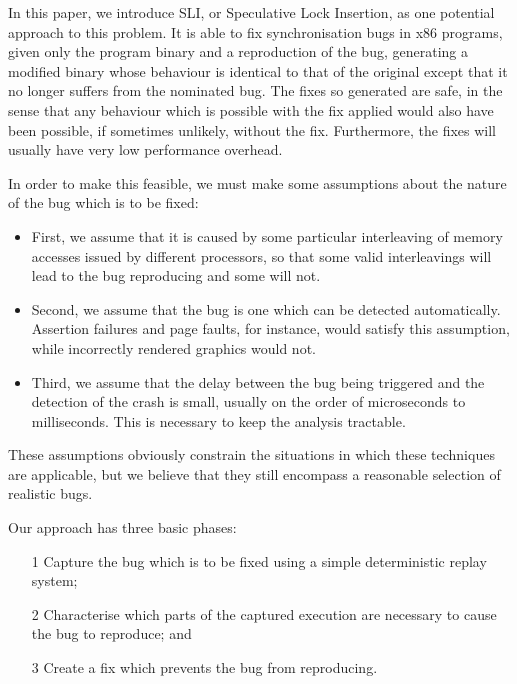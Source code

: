 \documentclass[10pt,a4paper,twocolumn]{article}
\begin{document}
In this paper, we introduce SLI, or Speculative Lock Insertion, as one
potential approach to this problem.  It is able to fix synchronisation
bugs in x86 programs, given only the program binary and a reproduction
of the bug, generating a modified binary whose behaviour is identical
to that of the original except that it no longer suffers from the
nominated bug.  The fixes so generated are safe, in the sense that any
behaviour which is possible with the fix applied would also have been
possible, if sometimes unlikely, without the fix.  Furthermore, the
fixes will usually have very low performance overhead.

In order to make this feasible, we must make some assumptions about
the nature of the bug which is to be fixed:

\begin{itemize}
\item First, we assume that it is caused by some particular
  interleaving of memory accesses issued by different processors, so
  that some valid interleavings will lead to the bug reproducing and
  some will not.

\item Second, we assume that the bug is one which can be detected
  automatically.  Assertion failures and page faults, for instance,
  would satisfy this assumption, while incorrectly rendered graphics
  would not.

\item Third, we assume that the delay between the bug being triggered
  and the detection of the crash is small, usually on the order of
  microseconds to milliseconds.  This is necessary to keep the
  analysis tractable.
\end{itemize}

These assumptions obviously constrain the situations in which these
techniques are applicable, but we believe that they still encompass a
reasonable selection of realistic bugs.

Our approach has three basic phases:

\begin{itemize}
\item[1] Capture the bug which is to be fixed using a simple
  deterministic replay system;
\item[2] Characterise which parts of the captured execution are
  necessary to cause the bug to reproduce; and
\item[3] Create a fix which prevents the bug from reproducing.
\end{itemize}
\end{document}

